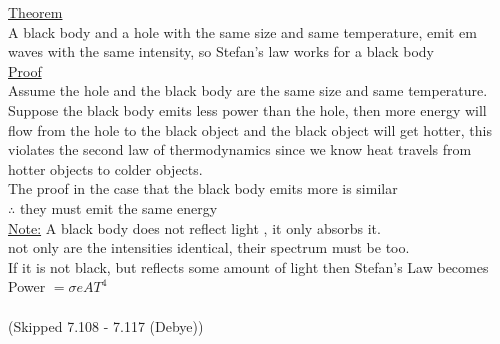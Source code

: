 \documentclass[12pt]{amsart}
\begin{document}
\begin{enumerate}
\hdashrule[0.5ex][c]{\linewidth}{0.5pt}{1.5mm}


\underline{Theorem}\\
A black body and a hole with the same size and same temperature, emit em waves with the same intensity, so Stefan's law works for a black body\\

\underline{Proof}\\
Assume the hole and the black body are the same size and same temperature. Suppose the black body emits less power than the hole, then more energy will flow from the hole to the black object and the black object will get hotter, this violates the second law of thermodynamics since we know heat travels from hotter objects to colder objects.\\
The proof in the case that the black body emits more is similar\\
$\therefore$ they must emit the same energy\\
\underline{Note:} A black body does not reflect light , it only absorbs it.\\
not only are the intensities identical, their spectrum must be too.\\
If it is not black, but reflects some amount of light then Stefan's Law becomes Power $= \sigma e A T^4$\\
\\
(Skipped 7.108 - 7.117 (Debye))\\


\hdashrule[0.5ex][c]{\linewidth}{0.5pt}{1.5mm}


\end{enumerate}
\end{document}
